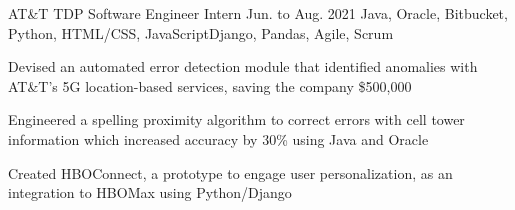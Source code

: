 \begin{cventry}
    {AT\&T}
    {TDP Software Engineer Intern}
    {Jun. to Aug. 2021}
    {Java, Oracle, Bitbucket, Python, HTML/CSS, JavaScript}{Django, Pandas, Agile, Scrum}
    \begin{cvitems}
        \item Devised an automated error detection module that identified anomalies with AT\&T's 5G location-based services, saving the company \$500,000
        \item Engineered a spelling proximity algorithm to correct errors with cell tower information which increased accuracy by 30\% using Java and Oracle
        \item Created HBOConnect, a prototype to engage user personalization, as an integration to HBOMax using Python/Django
    \end{cvitems}
\end{cventry}






